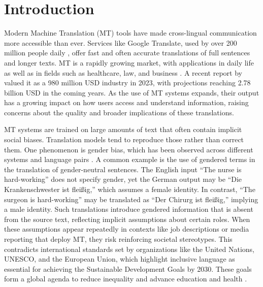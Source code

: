 \chapter{Introduction}
    Modern Machine Translation (MT) tools have made cross-lingual communication more accessible than ever. Services like Google Translate, used by over 200 million people daily \parencite{pratesAssessingGenderBias2019,shresthaExploringGenderBiases2022}, offer fast and often accurate translations of full sentences and longer texts. MT is a rapidly growing market, with applications in daily life as well as in fields such as healthcare, law, and business \parencite{kapplAreAllSpanish2025}. A recent report by \textcite{skyquestMachineTranslationMT2025} valued it as a 980 million USD industry in 2023, with projections reaching 2.78 billion USD in the coming years. As the use of MT systems expands, their output has a growing impact on how users access and understand information, raising concerns about the quality and broader implications of these translations.
    
    MT systems are trained on large amounts of text that often contain implicit social biases. Translation models tend to reproduce those rather than correct them. One phenomenon is gender bias, which has been observed across different systems and language pairs \parencite{choMeasuringGenderBias2019,soundararajanInvestigatingGenderBias2024,smacchiaDoesAIReflect2024}. A common example is the use of gendered terms in the translation of gender-neutral sentences. The English input “The nurse is hard-working” does not specify gender, yet the German output may be “Die Krankenschwester ist fleißig,” which assumes a female identity. In contrast, “The surgeon is hard-working” may be translated as “Der Chirurg ist fleißig,” implying a male identity. Such translations introduce gendered information that is absent from the source text, reflecting implicit assumptions about certain roles. When these assumptions appear repeatedly in contexts like job descriptions or media reporting that deploy MT, they risk reinforcing societal stereotypes. This contradicts international standards set by organizations like the United Nations, UNESCO, and the European Union, which highlight inclusive language as essential for achieving the Sustainable Development Goals by 2030. These goals form a global agenda to reduce inequality and advance education and health \parencite{unitednationsAchieveGenderEquality2023, sczesnyCanGenderFairLanguage2016}.

